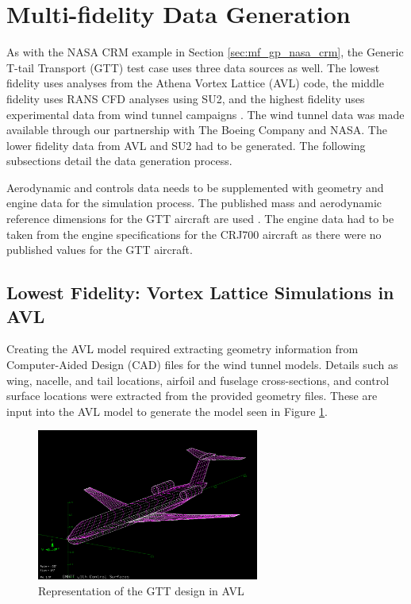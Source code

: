 \section{Multi-fidelity Data Generation} \label{sec:data_gen}

As with the NASA CRM example in Section \ref{sec:mf_gp_nasa_crm}, the Generic T-tail Transport (GTT) test case uses three data sources as well.
The lowest fidelity uses analyses from the Athena Vortex Lattice (AVL) code, the middle fidelity uses RANS CFD analyses using SU2, and the highest fidelity uses experimental data from wind tunnel campaigns \cite{cunningham_generic_2018,cunningham_preliminary_2018}.
The wind tunnel data was made available through our partnership with The Boeing Company and NASA. 
The lower fidelity data from AVL and SU2 had to be generated.
The following subsections detail the data generation process. 

Aerodynamic and controls data needs to be supplemented with geometry and engine data for the simulation process. 
The published mass and aerodynamic reference dimensions for the GTT aircraft are used \cite{cunningham_generic_2018}.
The engine data had to be taken from the engine specifications for the CRJ700 aircraft as there were no published values for the GTT aircraft.

\subsection{Lowest Fidelity: Vortex Lattice Simulations in AVL} \label{sec:data_gen_avl}
Creating the AVL model required extracting geometry information from Computer-Aided Design (CAD) files for the wind tunnel models. 
Details such as wing, nacelle, and tail locations, airfoil and fuselage cross-sections, and control surface locations were extracted from the provided geometry files. 
These are input into the AVL model to generate the model seen in Figure \ref{fig:gmatt_avl}. 

\begin{figure}
    \center
    \includegraphics[width=0.65\textwidth]{suthesis/images/gmatt_avl.png}
    \caption{Representation of the GTT design in AVL \label{fig:gmatt_avl}}
\end{figure}

